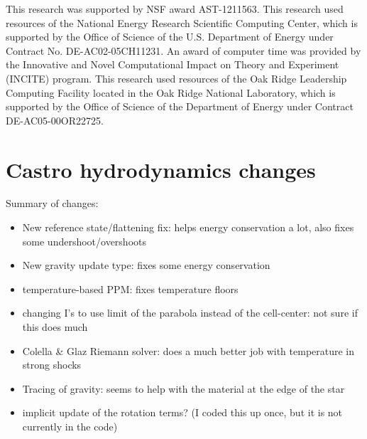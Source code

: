 \documentclass[12pt,preprint]{aastex}
\begin{document}
\acknowledgments

This research was supported by NSF award AST-1211563.  This research
used resources of the National Energy Research Scientific Computing
Center, which is supported by the Office of Science of the
U.S. Department of Energy under Contract No. DE-AC02-05CH11231.  An
award of computer time was provided by the Innovative and Novel
Computational Impact on Theory and Experiment (INCITE) program.  This
research used resources of the Oak Ridge Leadership Computing Facility
located in the Oak Ridge National Laboratory, which is supported by
the Office of Science of the Department of Energy under Contract
DE-AC05-00OR22725.

\clearpage





\clearpage
\appendix

\section{Castro hydrodynamics changes}

Summary of changes:
\begin{itemize}
\item New reference state/flattening fix: helps energy conservation a
  lot, also fixes some undershoot/overshoots

\item New gravity update type: fixes some energy conservation

\item temperature-based PPM: fixes temperature floors

\item changing I's to use limit of the parabola instead of the
  cell-center: not sure if this does much

\item Colella \& Glaz Riemann solver: does a much better job with
  temperature in strong shocks

\item Tracing of gravity: seems to help with the material at the edge
  of the star

\item implicit update of the rotation terms?  (I coded this up once, but
  it is not currently in the code)
\end{itemize}
\end{document}
